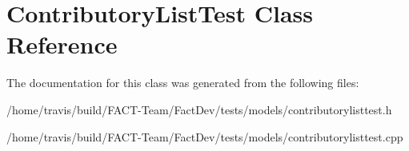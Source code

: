 \hypertarget{classContributoryListTest}{\section{Contributory\-List\-Test Class Reference}
\label{classContributoryListTest}
}


The documentation for this class was generated from the following files\-:\begin{DoxyCompactItemize}
\item 
/home/travis/build/\-F\-A\-C\-T-\/\-Team/\-Fact\-Dev/tests/models/contributorylisttest.\-h\item 
/home/travis/build/\-F\-A\-C\-T-\/\-Team/\-Fact\-Dev/tests/models/contributorylisttest.\-cpp\end{DoxyCompactItemize}
